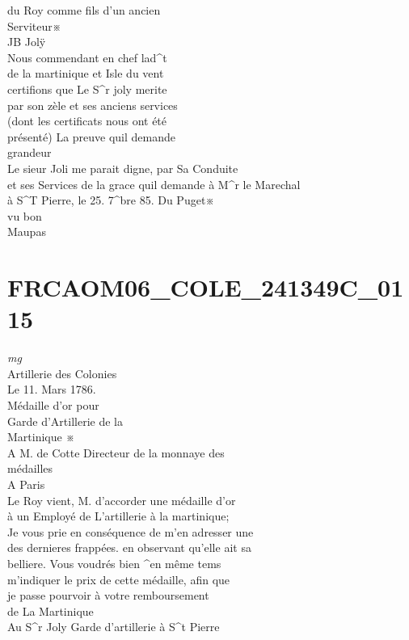 \documentclass{article}
\begin{document}
\begin{pages}
du Roy comme fils d'un ancien\\
Serviteur※\\
JB Jolÿ\\
Nous commendant en chef lad\^{}t\\
de la martinique et Isle du vent\\
certifions que Le S\^{}r joly merite\\
par son zèle et ses anciens services\\
(dont les certificats nous ont été\\
présenté) La preuve quil demande\\
grandeur
\pend\pstart
\\
Le sieur Joli me parait digne, par Sa Conduite\\
et ses Services de la grace quil demande à M\^{}r le Marechal\\
à S\^{}T Pierre, le 25. 7\^{}bre 85. Du Puget※\\
vu bon\\
Maupas
\pend
\endnumbering\beginnumbering\section{FRCAOM06\_COLE\_241349C\_0115}
\vspace{0.5cm}\noindent
\textit{mg}
\footnotesize \\
Artillerie des Colonies\\
Le 11. Mars 1786.\\
Médaille d'or pour\\
Garde d'Artillerie de la\\
Martinique ※
\normalsize \pstart
\\
A M. de Cotte Directeur de la monnaye des\\
médailles\\
A Paris\\
Le Roy vient, M. d'accorder une médaille d'or\\
à un Employé de L'artillerie à la martinique;\\
Je vous prie en conséquence de m'en adresser une\\
des dernieres frappées. en observant qu'elle ait sa\\
belliere. Vous voudrés bien \^{}en même tems\\
m'indiquer le prix de cette médaille, afin que\\
je passe pourvoir à votre remboursement\\
de La Martinique\\
Au S\^{}r Joly Garde d'artillerie à S\^{}t Pierre\\

\end{pages}
\end{document}
